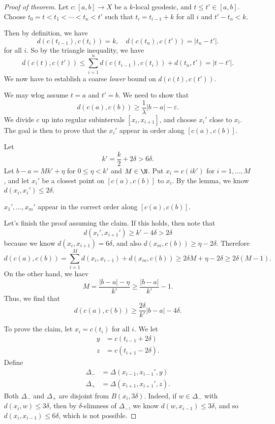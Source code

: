 \documentclass[a4paper]{article}
\begin{document}
\begin{proof}[Proof of theorem]
  Let $c: [a, b] \to X$ be a $k$-local geodesic, and $t \leq t' \in [a, b]$. Choose $t_0 = t < t_1 < \cdots < t_n < t'$ such that $t_i = t_{i - 1} + k$ for all $i$ and $t' - t_n < k$.

  Then by definition, we have
  \[
    d(c(t_{i - 1}), c(t_i)) = k,\quad d(c(t_n), c(t')) = |t_n - t'|.
  \]
  for all $i$. So by the triangle inequality, we have
  \[
    d(c(t), c(t')) \leq \sum_{i = 1}^n d(c(t_{i - 1}), c(t_i)) + d(t_n, t') = |t - t'|.
  \]
  We now have to establish a coarse \emph{lower} bound on $d(c(t), c(t'))$.

  We may wlog assume $t = a$ and $t' = b$. We need to show that
  \[
    d(c(a), c(b)) \geq \frac{1}{\lambda} |b - a| - \varepsilon.
  \]
  We divide $c$ up into regular subintervals $[x_i, x_{i + 1}]$, and choose $x_i'$ close to $x_i$. The goal is then to prove that the $x_i'$ appear in order along $[c(a), c(b)]$.

  Let
  \[
    k' = \frac{k}{2} + 2 \delta > 6\delta.
  \]
  Let $b - a = M k' + \eta$ for $0 \leq \eta < k'$ and $M \in \N$. Put $x_i = c(i k')$ for $i = 1, \ldots, M$, and let $x_i'$ be a closest point on $[c(a), c(b)]$ to $x_i$. By the lemma, we know $d(x_i, x_i') \leq 2\delta$.

  \begin{claim}
    $x_1', \ldots, x_m'$ appear in the correct order along $[c(a), c(b)]$.
  \end{claim}
  Let's finish the proof assuming the claim. If this holds, then note that
  \[
    d(x_i', x_{i + 1}') \geq k' - 4\delta > 2\delta
  \]
  because we know $d(x_i, x_{i + 1}) = 6\delta$, and also $d(x_m, c(b)) \geq \eta - 2 \delta$. Therefore
  \[
    d(c(a), c(b)) = \sum_{i = 1}^M d(x_i, x_{i - 1}) + d(x_m, c(b)) \geq 2 \delta M + \eta - 2 \delta \geq 2\delta(M - 1).
  \]
  On the other hand, we haev
  \[
    M = \frac{|b - a| - \eta}{k'} \geq \frac{|b - a|}{k'} - 1.
  \]
  Thus, we find that
  \[
    d(c(a), c(b)) \geq \frac{2\delta}{k'} |b - a| - 4 \delta.
  \]

  To prove the claim, let $x_i = c(t_i)$ for all $i$. We let
  \begin{align*}
    y &= c(t_{i - 1} + 2 \delta)\\
    z &= c(t_{i + 1} - 2 \delta).
  \end{align*}
  Define
  \begin{align*}
    \Delta_- &= \Delta(x_{i - 1}, x_{i - 1}', y)\\
    \Delta_+ &= \Delta(x_{i + 1}, x_{i + 1}', z).
  \end{align*}
  Both $\Delta_-$ and $\Delta_+$ are disjoint from $B(x_i, 3 \delta)$. Indeed, if $w \in \Delta_-$ with $d(x_i, w) \leq 3\delta$, then by $\delta$-slimness of $\Delta_-$, we know $d(w, x_{i - 1}) \leq 3 \delta$, and so $d(x_i, x_{i - 1}) \leq 6 \delta$, which is not possible.


\end{proof}
\end{document}
